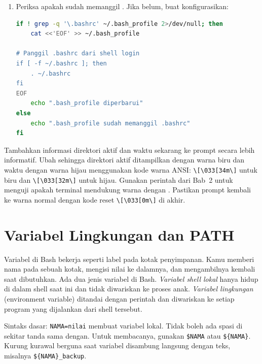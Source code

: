 \begin{enumerate}
    \item Periksa apakah  sudah memanggil
          . Jika belum, buat konfigurasikan:
\begin{lstlisting}[language=bash, caption={Memastikan .bash\_profile memanggil .bashrc}]
if ! grep -q '\.bashrc' ~/.bash_profile 2>/dev/null; then
    cat <<'EOF' >> ~/.bash_profile

# Panggil .bashrc dari shell login
if [ -f ~/.bashrc ]; then
    . ~/.bashrc
fi
EOF
    echo ".bash_profile diperbarui"
else
    echo ".bash_profile sudah memanggil .bashrc"
fi
\end{lstlisting}
\end{enumerate}

\begin{challengebox}
Tambahkan informasi direktori aktif dan waktu sekarang ke prompt secara
lebih informatif. Ubah  sehingga direktori aktif ditampilkan
dengan warna biru dan waktu dengan warna hijau menggunakan kode warna ANSI:
\texttt{\textbackslash[\textbackslash 033[34m\textbackslash]} untuk biru
dan \texttt{\textbackslash[\textbackslash 033[32m\textbackslash]} untuk
hijau. Gunakan perintah  dari Bab~2 untuk menguji apakah
terminal mendukung warna dengan \cmd{echo -e \textbackslash
033[32mHijau\textbackslash033[0m}. Pastikan prompt kembali ke warna normal
dengan kode reset \texttt{\textbackslash[\textbackslash033[0m\textbackslash]}
di akhir.
\end{challengebox}

\section{Variabel Lingkungan dan PATH}
\label{sec:variabel-lingkungan-path}

Variabel di Bash bekerja seperti label pada kotak penyimpanan. Kamu
memberi nama pada sebuah kotak, mengisi nilai ke dalamnya, dan
mengambilnya kembali saat dibutuhkan. Ada dua jenis variabel di Bash.
\textit{Variabel shell lokal} hanya hidup di dalam shell saat ini dan
tidak diwariskan ke proses anak. \textit{Variabel lingkungan} (environment
variable) ditandai dengan perintah  dan diwariskan ke setiap
program yang dijalankan dari shell tersebut.

Sintaks dasar: \texttt{NAMA=nilai} membuat variabel lokal. Tidak boleh ada
spasi di sekitar tanda sama dengan. Untuk membacanya, gunakan
\texttt{\$NAMA} atau \texttt{\$\{NAMA\}}. Kurung kurawal berguna saat
variabel disambung langsung dengan teks, misalnya
\texttt{\$\{NAMA\}\_backup}.

